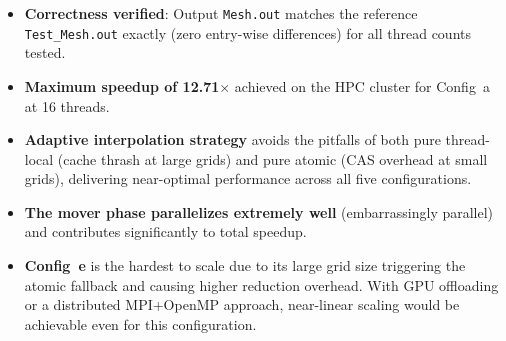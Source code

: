\documentclass[12pt,a4paper]{article}
\begin{document}
\begin{itemize}
    \item \textbf{Correctness verified}: Output \texttt{Mesh.out} matches the reference
          \texttt{Test\_Mesh.out} exactly (zero entry-wise differences) for all thread
          counts tested.
    \item \textbf{Maximum speedup of 12.71$\times$} achieved on the HPC cluster for
          Config~a at 16 threads.
    \item \textbf{Adaptive interpolation strategy} avoids the pitfalls of both pure
          thread-local (cache thrash at large grids) and pure atomic (CAS overhead at
          small grids), delivering near-optimal performance across all five
          configurations.
    \item \textbf{The mover phase parallelizes extremely well} (embarrassingly parallel)
          and contributes significantly to total speedup.
    \item \textbf{Config~e} is the hardest to scale due to its large grid size triggering
          the atomic fallback and causing higher reduction overhead. With GPU offloading or
          a distributed MPI+OpenMP approach, near-linear scaling would be achievable even
          for this configuration.
\end{itemize}
\end{document}

